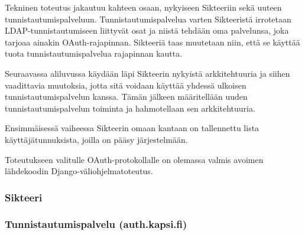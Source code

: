 Tekninen toteutus jakautuu kahteen osaan, nykyiseen Sikteeriin sekä uuteen tunnistautumispalveluun. Tunnistautumispalvelua varten Sikteeristä irrotetaan LDAP-tunnistautumiseen liittyvät osat ja niistä tehdään oma palvelunsa, joka tarjoaa ainakin OAuth-rajapinnan. Sikteeriä taas muutetaan niin, että se käyttää tuota tunnistautumispalvelua rajapinnan kautta.

Seuraavassa aliluvussa käydään läpi Sikteerin nykyistä arkkitehtuuria ja siihen vaadittavia muutoksia, jotta sitä voidaan käyttää yhdessä ulkoisen tunnistautumispalvelun kanssa. Tämän jälkeen määritellään uuden tunnistautumispalvelun toiminta ja hahmotellaan sen arkkitehtuuria.

Ensimmäisessä vaiheessa Sikteerin omaan kantaan on tallennettu lista käyttäjätunnuksista, joilla on pääsy järjestelmään.

Toteutukseen valitulle OAuth-protokollalle on olemassa valmis avoimen lähdekoodin Django-väliohjelmatoteutus.

\subsubsection{Sikteeri}

\subsubsection{Tunnistautumispalvelu (auth.kapsi.fi)}
